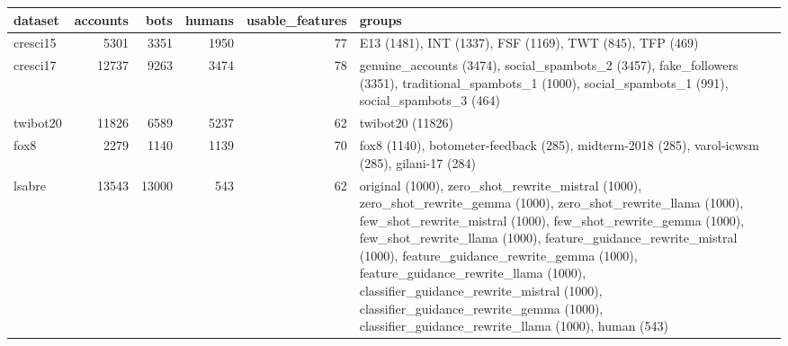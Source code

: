 \begin{tabular}{lrrrrl}
\toprule
dataset & accounts & bots & humans & usable_features & groups \\
\midrule
cresci15 & 5301 & 3351 & 1950 & 77 & E13 (1481), INT (1337), FSF (1169), TWT (845), TFP (469) \\
cresci17 & 12737 & 9263 & 3474 & 78 & genuine_accounts (3474), social_spambots_2 (3457), fake_followers (3351), traditional_spambots_1 (1000), social_spambots_1 (991), social_spambots_3 (464) \\
twibot20 & 11826 & 6589 & 5237 & 62 & twibot20 (11826) \\
fox8 & 2279 & 1140 & 1139 & 70 & fox8 (1140), botometer-feedback (285), midterm-2018 (285), varol-icwsm (285), gilani-17 (284) \\
lsabre & 13543 & 13000 & 543 & 62 & original (1000), zero_shot_rewrite_mistral (1000), zero_shot_rewrite_gemma (1000), zero_shot_rewrite_llama (1000), few_shot_rewrite_mistral (1000), few_shot_rewrite_gemma (1000), few_shot_rewrite_llama (1000), feature_guidance_rewrite_mistral (1000), feature_guidance_rewrite_gemma (1000), feature_guidance_rewrite_llama (1000), classifier_guidance_rewrite_mistral (1000), classifier_guidance_rewrite_gemma (1000), classifier_guidance_rewrite_llama (1000), human (543) \\
\bottomrule
\end{tabular}
